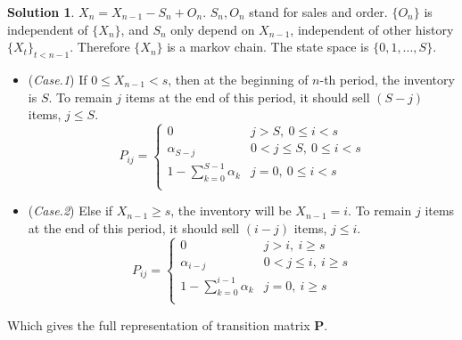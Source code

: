 \documentclass[a4paper, 10pt]{article}
\theoremstyle{definition}
\theoremstyle{hSol}
\newtheorem*{solution}{Solution}
\begin{document}
\begin{solution} $X_n = X_{n-1}-S_n+O_n$. $S_n,O_n$ stand for sales and order. $\{O_n\}$ is independent of $\{X_n\}$, and $S_n$ only depend on $X_{n-1}$, independent of other history $\{X_t\}_{t<n-1}$. Therefore $\{X_n\}$ is a markov chain. The state space is $\{0,1,..., S\}$.\\
\begin{itemize}
  \item[] (\textit{Case.1}) If $0\leq X_{n-1}<s$, then at the beginning of $n$-th period, the inventory is $S$. To remain $j$ items at the end of this period, it should sell $(S-j)$ items, $j\leq S$.
  \begin{equation}
    P_{ij} = 
    \begin{cases}
    0 & j>S,~0\leq i<s\\
    \alpha_{S-j} & 0<j\leq S,~0\leq i<s \\
    1-\sum_{k=0}^{S-1} \alpha_k & j=0,~0\leq i<s\\
    \end{cases}
  \end{equation}
  \item[] (\textit{Case.2}) Else if $X_{n-1}\geq s$, the inventory will be $X_{n-1}=i$. To remain $j$ items at the end of this period, it should sell $(i-j)$ items, $j\leq i$.
  \begin{equation}
    P_{ij} = 
    \begin{cases}
    0 & j>i,~i\geq s\\
    \alpha_{i-j} & 0<j\leq i,~i\geq s \\
    1-\sum_{k=0}^{i-1} \alpha_k & j=0,~i\geq s\\
    \end{cases}
  \end{equation}
\end{itemize}
Which gives the full representation of transition matrix $\bm{P}$.
 
\end{solution}
\end{document}
